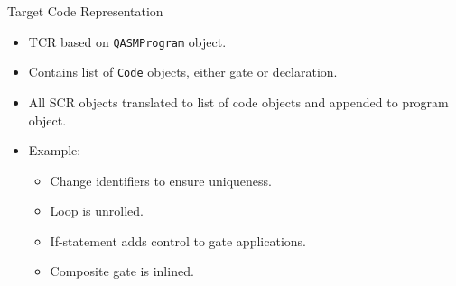 \begin{frame}{Target Code Representation}    
    \begin{minipage}{.38\textwidth}
        \begin{itemize}
            \item TCR based on \texttt{QASMProgram} object.
            \item Contains list of \texttt{Code} objects, either gate or declaration. 
            \item All SCR objects translated to list of code objects and appended to program object.
            \item Example:
            \begin{itemize}
                \item Change identifiers to ensure uniqueness.
                \item Loop is unrolled.
                \item If-statement adds control to gate applications.
                \item Composite gate is inlined.
            \end{itemize} 
        \end{itemize}
    \end{minipage}    
    \begin{minipage}{.32\textwidth}
        \centering
        \begin{figure}[htp]
            \centering

\end{figure}
\end{minipage}
\end{frame}

